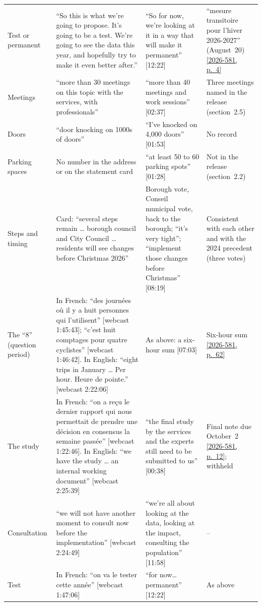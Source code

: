\documentclass[11pt,letterpaper]{article}
\newcommand{\pagesurl}{https://openmobilitydata.github.io/Terrebonne-access-requests}
\newcommand{\cliptime}[1]{\textsf{\small[#1]}}
\newcommand{\wctime}[1]{\textsf{\small[webcast #1]}}
\newcommand{\pgl}[2]{\href{\pagesurl/2026-581/raw/01_emails_mandate_counts.pdf\#page=#1}{\textsf{\small[2026-581, p.~#2]}}}
\newcommand{\pg}[1]{\pgl{#1}{#1}}
\newif\ifqa\qatrue
\begin{document}
\begin{small}
\begin{longtable}{>{\raggedright\arraybackslash}p{2.2cm}>{\raggedright\arraybackslash}p{4.4cm}>{\raggedright\arraybackslash}p{4.4cm}>{\raggedright\arraybackslash}p{3.6cm}}
\addlinespace
Test or permanent & ``So this is what we're going to propose. It's going to be a test. We're going to see the data this year, and hopefully try to make it even better after.'' & ``So for now, we're looking at it in a way that will make it permanent'' \cliptime{12:22} & ``mesure transitoire pour l'hiver 2026-2027'' (August~20) \pg{4} \\
\addlinespace
Meetings & ``more than 30 meetings on this topic with the services, with professionals'' & ``more than 40 meetings and work sessions'' \cliptime{02:37} & Three meetings named in the release (section~2.5) \\
\addlinespace
Doors & ``door knocking on 1000s of doors'' & ``I've knocked on 4,000 doors'' \cliptime{01:53} & No record \\
\addlinespace
Parking spaces & No number in the address or on the statement card & ``at least 50 to 60 parking spots'' \cliptime{01:28} & Not in the release (section~2.2) \\
\addlinespace
Steps and timing & Card: ``several steps remain … borough council and City Council … residents will see changes before Christmas 2026'' & Borough vote, Conseil municipal vote, back to the borough; ``it's very tight''; ``implement those changes before Christmas'' \cliptime{08:19} & Consistent with each other and with the 2024 precedent (three votes) \\
\ifqa
\addlinespace
The ``8'' (question period) & In French: ``des journées où il y a huit personnes qui l'utilisent'' \wctime{1:45:43}; ``c'est huit comptages pour quatre cyclistes'' \wctime{1:46:42}. In English: ``eight trips in January … Per hour. Heure de pointe.'' \wctime{2:22:06} & As above: a six-hour sum \cliptime{07:03} & Six-hour sum \pg{62} \\
\addlinespace
The study & In French: ``on a reçu le dernier rapport qui nous permettait de prendre une décision en consensus la semaine passée'' \wctime{1:22:46}. In English: ``we have the study … an internal working document'' \wctime{2:25:39} & ``the final study by the services and the experts still need to be submitted to us'' \cliptime{00:38} & Final note due October~2 \pg{12}; withheld \\
\addlinespace
Consultation & ``we will not have another moment to consult now before the implementation'' \wctime{2:24:49} & ``we're all about looking at the data, looking at the impact, consulting the population'' \cliptime{11:58} & -- \\
\addlinespace
Test & In French: ``on va le tester cette année'' \wctime{1:47:06} & ``for now… permanent'' \cliptime{12:22} & As above \\
\fi
\bottomrule
\end{longtable}
\end{small}
\end{document}
